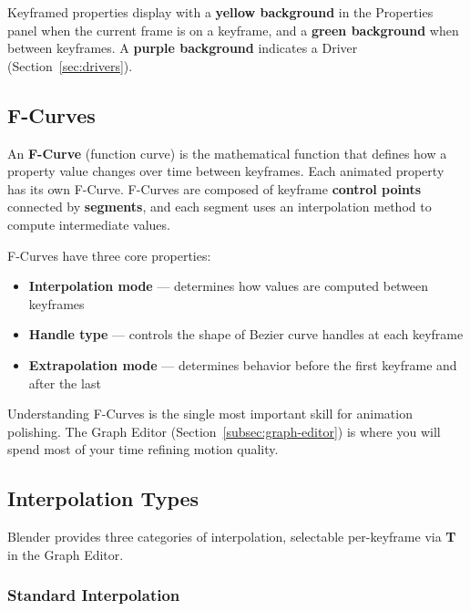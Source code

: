 Keyframed properties display with a \textbf{yellow background} in the Properties panel when the current frame is on a keyframe, and a \textbf{green background} when between keyframes. A \textbf{purple background} indicates a Driver (Section~\ref{sec:drivers}).

\subsection{F-Curves}
\label{subsec:fcurves}

An \textbf{F-Curve} (function curve) is the mathematical function that defines how a property value changes over time between keyframes. Each animated property has its own F-Curve. F-Curves are composed of keyframe \textbf{control points} connected by \textbf{segments}, and each segment uses an interpolation method to compute intermediate values.

F-Curves have three core properties:

\begin{itemize}[leftmargin=2em]
  \item \textbf{Interpolation mode} --- determines how values are computed between keyframes
  \item \textbf{Handle type} --- controls the shape of Bezier curve handles at each keyframe
  \item \textbf{Extrapolation mode} --- determines behavior before the first keyframe and after the last
\end{itemize}

Understanding F-Curves is the single most important skill for animation polishing. The Graph Editor (Section~\ref{subsec:graph-editor}) is where you will spend most of your time refining motion quality.

\subsection{Interpolation Types}
\label{subsec:interpolation}

Blender provides three categories of interpolation, selectable per-keyframe via \textbf{T} in the Graph Editor.

\subsubsection{Standard Interpolation}

